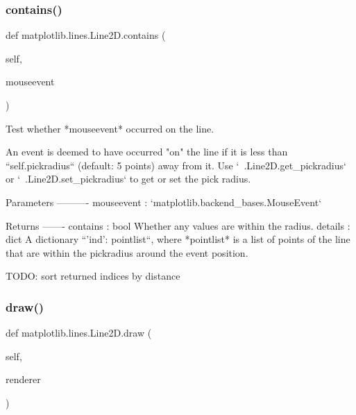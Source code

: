 \mbox{\label{classmatplotlib_1_1lines_1_1Line2D_a6e150da55177aacda6cab646155100c2}} 
\subsubsection{\texorpdfstring{contains()}{contains()}}
{\footnotesize\ttfamily def matplotlib.\+lines.\+Line2\+D.\+contains (\begin{DoxyParamCaption}\item[{}]{self,  }\item[{}]{mouseevent }\end{DoxyParamCaption})}

\begin{DoxyVerb}Test whether *mouseevent* occurred on the line.

An event is deemed to have occurred "on" the line if it is less
than ``self.pickradius`` (default: 5 points) away from it.  Use
`~.Line2D.get_pickradius` or `~.Line2D.set_pickradius` to get or set
the pick radius.

Parameters
----------
mouseevent : `matplotlib.backend_bases.MouseEvent`

Returns
-------
contains : bool
    Whether any values are within the radius.
details : dict
    A dictionary ``{'ind': pointlist}``, where *pointlist* is a
    list of points of the line that are within the pickradius around
    the event position.

    TODO: sort returned indices by distance
\end{DoxyVerb}
 \mbox{\label{classmatplotlib_1_1lines_1_1Line2D_a100d266c9e4a70461353b16d3f7c8d91}} 
\subsubsection{\texorpdfstring{draw()}{draw()}}
{\footnotesize\ttfamily def matplotlib.\+lines.\+Line2\+D.\+draw (\begin{DoxyParamCaption}\item[{}]{self,  }\item[{}]{renderer }\end{DoxyParamCaption})}

